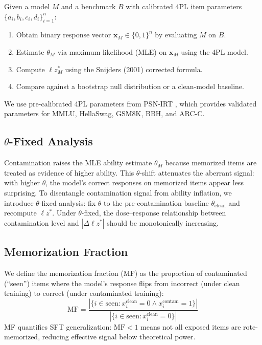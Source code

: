 \documentclass[11pt,a4paper]{article}
\begin{document}
Given a model $M$ and a benchmark $B$ with calibrated 4PL item parameters $\{a_i, b_i, c_i, d_i\}_{i=1}^{n}$:

\begin{enumerate}
\item Obtain binary response vector $\mathbf{x}_M \in \{0,1\}^n$ by evaluating $M$ on $B$.
\item Estimate $\theta_M$ via maximum likelihood (MLE) on $\mathbf{x}_M$ using the 4PL model.
\item Compute $\ell z^*_M$ using the Snijders (2001) corrected formula.
\item Compare against a bootstrap null distribution or a clean-model baseline.
\end{enumerate}

We use pre-calibrated 4PL parameters from PSN-IRT \citep{psnirt2026}, which provides validated parameters for MMLU, HellaSwag, GSM8K, BBH, and ARC-C.

\subsection{$\theta$-Fixed Analysis}

Contamination raises the MLE ability estimate $\theta_M$ because memorized items are treated as evidence of higher ability.
This $\theta$-shift attenuates the aberrant signal: with higher $\theta$, the model's correct responses on memorized items appear less surprising.
To disentangle contamination signal from ability inflation, we introduce $\theta$-fixed analysis: fix $\theta$ to the pre-contamination baseline $\theta_{\text{clean}}$ and recompute $\ell z^*$.
Under $\theta$-fixed, the dose--response relationship between contamination level and $|\Delta \ell z^*|$ should be monotonically increasing.

\subsection{Memorization Fraction}

We define the memorization fraction (MF) as the proportion of contaminated (``seen'') items where the model's response flips from incorrect (under clean training) to correct (under contaminated training):
\begin{equation}
\text{MF} = \frac{|\{i \in \text{seen} : x^{\text{clean}}_i = 0 \wedge x^{\text{contam}}_i = 1\}|}{|\{i \in \text{seen} : x^{\text{clean}}_i = 0\}|}
\end{equation}
MF quantifies SFT generalization: $\text{MF}{<}1$ means not all exposed items are rote-memorized, reducing effective signal below theoretical power.
\end{document}

